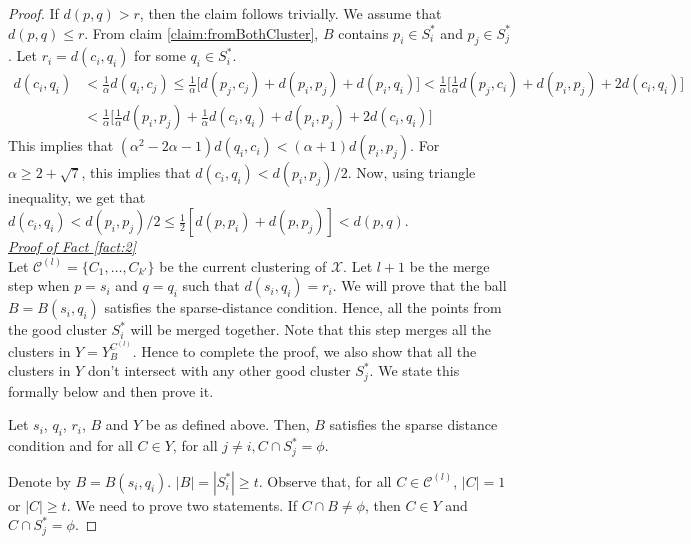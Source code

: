 \documentclass[11pt]{article}
\newcommand{\mc}{\mathcal}
\begin{document}
\begin{proof}
\vspace{-0.1in} If $d(p, q) > r$, then the claim follows trivially. We assume that $d(p, q) \le r$. From claim \ref{claim:fromBothCluster}, $B$ contains $p_i \in S_i^*$ and $p_j \in S_j^*$. Let $r_i = d(c_i, q_i)$ for some $q_i \in S_i^*$.
\begin{align*}
d(c_i, q_i) &< \frac{1}{\alpha} d(q_i, c_j) \le \frac{1}{\alpha} \bigg[ d(p_j, c_j) + d(p_i, p_j) + d(p_i, q_i)\bigg] < \frac{1}{\alpha} \bigg[ \frac{1}{\alpha}d(p_j, c_i) + d(p_i, p_j) + 2d(c_i, q_i)\bigg]\\
& < \frac{1}{\alpha} \bigg[ \frac{1}{\alpha}d(p_i, p_j) + \frac{1}{\alpha}d(c_i, q_i) + d(p_i, p_j) + 2d(c_i, q_i)\bigg]
\end{align*}
This implies that $(\alpha^2 - 2\alpha - 1)d(q_i, c_i) < (\alpha + 1) d(p_i, p_j)$. For $\alpha \ge 2 + \sqrt 7$, this implies that $d(c_i, q_i) < d(p_i, p_j)/2$. Now, using triangle inequality, we get that $d(c_i, q_i) < d(p_i, p_j)/2 \le \frac{1}{2}[d(p, p_i) + d(p, p_j)] < d(p, q)$.\\

\noindent\textit{\underline{Proof of Fact \ref{fact:2}%
}}\\
Let $\mc C^{(l)} = \{C_1, \ldots, C_{k'}\}$ be the current clustering of $\mc X$. Let $l+1$ be the merge step when $p = s_i$ and $q = q_i$ such that $d(s_i, q_i) = r_i$. We will prove that the ball $B = B(s_i, q_i)$ satisfies the sparse-distance condition. Hence, all the points from the good cluster $S_i^*$ will be merged together. Note that this step merges all the clusters in $Y = Y_B^{C^{(l)}}$. Hence to complete the proof, we also show that all the clusters in $Y$ don't intersect with any other good cluster $S_j^*$. We state this formally below and then prove it.

\begin{claim}
\label{claim:dciqi}
Let $s_i$, $q_i$, $r_i$, $B$ and $Y$ be as defined above. Then, $B$ satisfies the sparse distance condition and for all $C \in Y$, for all $j \neq i, C \cap S_j^* = \phi$.
\end{claim}

\vspace{-0.1in} Denote by $B = B(s_i, q_i)$. $|B| = |S_i^*| \ge t$. Observe that, for all $C \in \mc C^{(l)}$, $|C| = 1$ or $|C| \ge t$. We need to prove two statements. If $C \cap B \neq \phi$, then $C \in Y$ and $C \cap S_j^* = \phi$. 


\end{proof}
\end{document}
